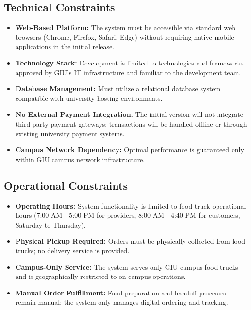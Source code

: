 \documentclass[12pt,a4paper]{article}
\begin{document}
\begin{itemize}[leftmargin=2em, itemsep=6pt]
\subsection{Technical Constraints}
\begin{itemize}[leftmargin=2em, itemsep=8pt]
    \item \textbf{Web-Based Platform:} The system must be accessible via standard web browsers (Chrome, Firefox, Safari, Edge) without requiring native mobile applications in the initial release.
    \item \textbf{Technology Stack:} Development is limited to technologies and frameworks approved by GIU's IT infrastructure and familiar to the development team.
    \item \textbf{Database Management:} Must utilize a relational database system compatible with university hosting environments.
    \item \textbf{No External Payment Integration:} The initial version will not integrate third-party payment gateways; transactions will be handled offline or through existing university payment systems.
    \item \textbf{Campus Network Dependency:} Optimal performance is guaranteed only within GIU campus network infrastructure.
\end{itemize}

\subsection{Operational Constraints}
\begin{itemize}[leftmargin=2em, itemsep=8pt]
    \item \textbf{Operating Hours:} System functionality is limited to food truck operational hours (7:00 AM - 5:00 PM for providers, 8:00 AM - 4:40 PM for customers, Saturday to Thursday).
    \item \textbf{Physical Pickup Required:} Orders must be physically collected from food trucks; no delivery service is provided.
    \item \textbf{Campus-Only Service:} The system serves only GIU campus food trucks and is geographically restricted to on-campus operations.
    \item \textbf{Manual Order Fulfillment:} Food preparation and handoff processes remain manual; the system only manages digital ordering and tracking.
\end{itemize}


\end{itemize}
\end{document}
